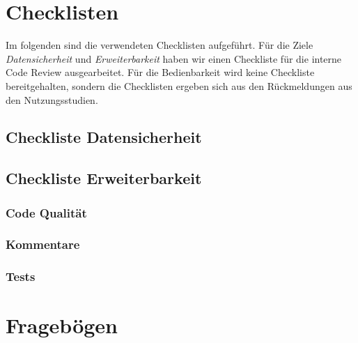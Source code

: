 \documentclass[accentcolor=tud0b,12pt,paper=a4]{tudreport}
\begin{document}
\appendix
\chapter{Checklisten}
\renewcommand{\labelitemi}{\scriptsize$\square$}
Im folgenden sind die verwendeten Checklisten aufgeführt. Für die Ziele \emph{Datensicherheit} und \emph{Erweiterbarkeit} haben wir einen Checkliste für die interne Code Review ausgearbeitet. Für die Bedienbarkeit wird keine Checkliste bereitgehalten, sondern die Checklisten ergeben sich aus den Rückmeldungen aus den Nutzungsstudien.

\section{Checkliste Datensicherheit}


\section{Checkliste Erweiterbarkeit}
\begin{multicols}{2}
	\subsection{Code Qualität}

	\subsection{Kommentare}

	\subsection{Tests}

\end{multicols}

\chapter{Fragebögen}
\end{document}
